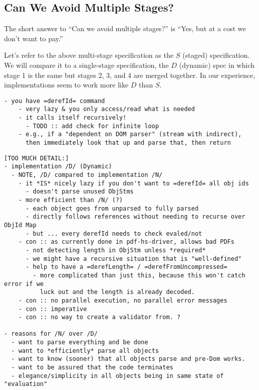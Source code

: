 \subsection{Can We Avoid Multiple Stages? }
\label{sec:single-pass-problems}

\newcommand{\ssp}{$S$}
\newcommand{\dsp}{$D$}

The short answer to ``Can we avoid multiple stages?'' is
``Yes, but at a cost we don't want to pay.''

Let's refer to the above multi-stage specification as the \ssp{}
(staged) specification.
%
We will compare it to a single-stage specification, the \dsp{}
(dynamic) spec in which stage 1 is the same but stages 2, 3, and 4 are
merged together.
In our experience, implementations seem to work more like \dsp{} than \ssp{}.

\mttodo{Here's how \dsp{} works: ...}
\begin{lstlisting}[style=meta]
  - you have =derefId= command
    - very lazy & you only access/read what is needed
    - it calls itself recursively!
      - TODO :: add check for infinite loop
    - e.g., if a "dependent on DOM parser" (stream with indirect), 
      then immediately look that up and parse that, then return
\end{lstlisting}

\mttodo{To compare \ssp{} and \dsp{} ...}
\begin{lstlisting}[style=meta]
[TOO MUCH DETAIL:]
- implementation /D/ (Dynamic)
  - NOTE, /D/ compared to implementation /N/     
    - it *IS* nicely lazy if you don't want to =derefId= all obj ids
      - doesn't parse unused ObjStms
    - more efficient than /N/ (?)
      - each object goes from unparsed to fully parsed
      - directly follows references without needing to recurse over ObjId Map
      - but ... every derefId needs to check evaled/not
    - con :: as currently done in pdf-hs-driver, allows bad PDFs
      - not detecting length in ObjStm unless *required*
      - we might have a recursive situation that is "well-defined"
      - help to have a =derefLength= / =derefFromUncompressed=
        - more complicated than just this, because this won't catch error if we
          luck out and the length is already decoded.
    - con :: no parallel execution, no parallel error messages
    - con :: imperative
    - con :: no way to create a validator from. ?
            
- reasons for /N/ over /D/
  - want to parse everything and be done
  - want to *efficiently* parse all objects
  - want to know (sooner) that all objects parse and pre-Dom works.
  - want to be assured that the code terminates 
  - elegance/simplicity in all objects being in same state of "evaluation"
\end{lstlisting}

